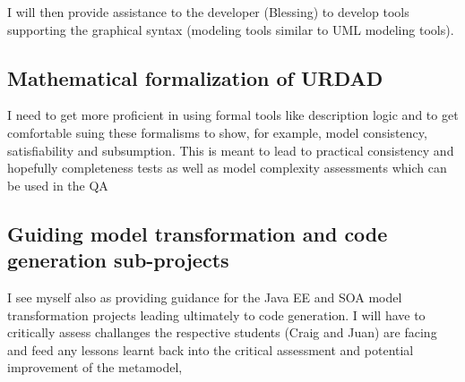 I will then provide assistance to the developer (Blessing) to develop tools supporting the graphical syntax (modeling tools similar to UML modeling tools).

\subsection{Mathematical formalization of URDAD}
I need to get more proficient in using formal tools like description logic and to get comfortable suing these formalisms to show, for example,  model consistency, satisfiability and subsumption. This is meant to lead to practical consistency and hopefully completeness tests as well as model complexity assessments which can be used in the QA 

\subsection{Guiding model transformation and code generation sub-projects}

I see myself also as providing guidance for the Java EE and SOA model transformation projects leading ultimately to code generation. I will have to critically assess challanges the respective students (Craig and Juan) are facing and feed any lessons learnt back into the critical assessment and potential improvement of the metamodel,

